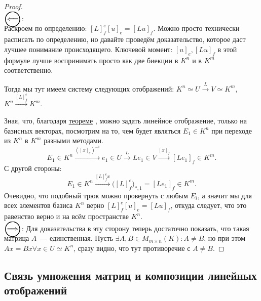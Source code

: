 \begin{proof}\leavevmode\\
    $\ola$:\\
    Раскроем по определению: $[L]^e_f[u]_e=[Lu]_f$.
    Можно просто технически расписать по определению, но давайте проведём доказательство,
    которое даст лучшее понимание происходящего. Ключевой момент: $[u]_e, [Lu]_f$ в этой
    формуле лучше воспринимать просто как две биекции в $K^n$ и в $K^m$ соответственно.

    Тогда мы тут имеем систему следующих отображений:
    $K^n \simeq U \xrightarrow{L} V \simeq K^m$,
    $K^n\xrightarrow{[L]^e_f} K^m$.

    Зная, что, благодаря 
    \hyperref[thm:Линейное отображение однозначно задаётся двумя базисами]{теореме}
    , можно задать линейное отображение, только на базисных векторах, посмотрим на то, чем
    будет являться $E_1\in K^n$ при переходе из $K^n$ в $K^m$ разными методами.
    \[
        E_1\in K^n \xrightarrow{([x]_e)^{-1}} e_1 \in U \xrightarrow{L} Le_1 \in V
        \xrightarrow{[x]_f} [Le_1]_f\in K^m
    .\]
    С другой стороны:
    \[
        E_1\in K^n\xrightarrow{[L]^e_fx} \Big([L]^e_f\Big)_{*, 1} = [Le_1]_f\in K^m
    .\] 
    Очевидно, что подобный трюк можно провернуть с любым $E_i$, а значит мы для всех
    элементов базиса $K^n$ верно $[L]^e_f[u]_e=[Lu]_f$, откуда следует, что это равенство
    верно и на всём пространстве $K^n$.\\
    $\ora$:
    Для доказательства в эту сторону теперь достаточно показать, что такая матрица $A$~---
    единственная. Пусть $\exists A,B\in M_{m\times n}(K)\colon A \not = B$, но при этом 
    $Ax = Bx \forall x\in U\simeq K^n$, сразу видно, что тут противоречие с $A\not=B$.
\end{proof}
\subsection{Связь умножения матриц и композиции линейных отображений}
